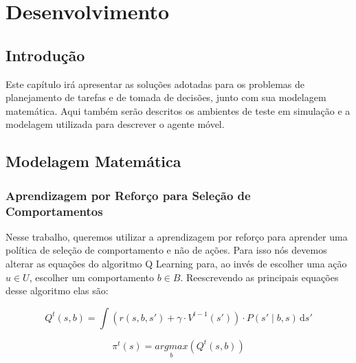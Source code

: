 


\chapter{Desenvolvimento\label{chap:Desenvolvimento}}


\section{Introdução}

Este capítulo irá apresentar as soluções adotadas para os problemas de planejamento de tarefas e de tomada de decisões, junto com sua modelagem matemática. Aqui também serão descritos os ambientes de teste em simulação e a modelagem utilizada para descrever o agente móvel.

\section{Modelagem Matemática}

\subsection{Aprendizagem por Reforço para Seleção de Comportamentos} \label{subsection:QLearningSelecaoDeComportamento}

Nesse trabalho, queremos utilizar a aprendizagem por reforço para aprender uma política de seleção de comportamento e não de ações. Para isso nós devemos alterar as equações do algoritmo Q Learning para, ao invés de escolher uma ação $ u \in U $, escolher um comportamento $ b \in B $. Reescrevendo as principais equações desse algoritmo elas são:

\begin{equation} \label{equation:QValueFunctionBehavior}
    Q^t \left( s, b \right) = \int \! \left( r \left( s, b, s' \right) + \gamma \cdot V^{t-1} \left( s' \right) \right) \cdot P \left( s' \mid b, s \right) \, \mathrm{d}s'
\end{equation}


\begin{equation} \label{equation:PolicySelectionBehavior}
    \pi^t \left( s \right) = \underset{b}{argmax} \left( Q^t \left( s, b \right) \right)
\end{equation}


